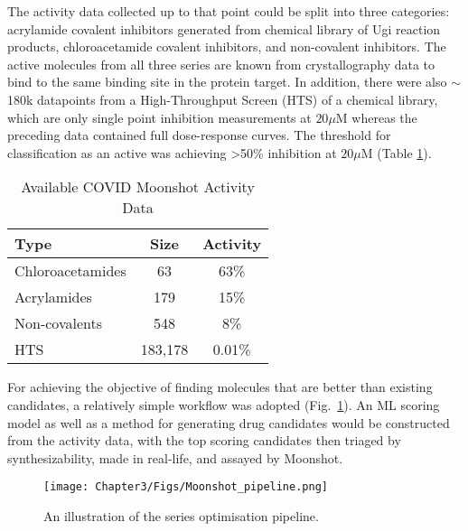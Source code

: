 The activity data collected up to that point could be split into three categories: acrylamide covalent inhibitors generated from chemical library of Ugi reaction products, chloroacetamide covalent inhibitors, and non-covalent inhibitors. The active molecules from all three series are known from crystallography data to bind to the same binding site in the protein target. In addition, there were also $\sim$180k datapoints from a High-Throughput Screen (HTS) of a chemical library, which are only single point inhibition measurements at $20\mu$M whereas the preceding data contained full dose-response curves. The threshold for classification as an active was achieving >50\% inhibition at $20\mu$M (Table \ref{table:actvitiy_table}).

\begin{table}[!h]
\caption{Available COVID Moonshot Activity Data}
\centering
\label{table:actvitiy_table}
\begin{tabular}{l c c}
\toprule
 Type & Size & Activity \\ 
\midrule
Chloroacetamides & 63 & 63\%  \\

Acrylamides & 179 & 15\%  \\

Non-covalents & 548 & 8\%  \\

HTS & 183,178 & 0.01\%  \\
\bottomrule
\end{tabular}
\end{table}

For achieving the objective of finding molecules that are better than existing candidates, a relatively simple workflow was adopted (Fig.~\ref{fig:pipe}). An ML scoring model as well as a method for generating drug candidates would be constructed from the activity data, with the top scoring candidates then triaged by synthesizability, made in real-life, and assayed by Moonshot.

\begin{figure}[!h] %
\centering
\texttt{[image: Chapter3/Figs/Moonshot\_pipeline.png]}
\caption{\label{fig:pipe} An illustration of the series optimisation pipeline.}
\end{figure}

